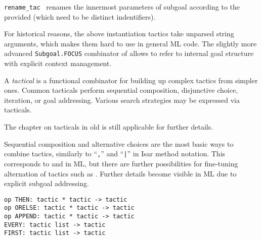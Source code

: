 \begin{isabellebody}
\begin{isamarkuptext}
\begin{description}
  \item \verb|rename_tac|~ renames the innermost
  parameters of subgoal  according to the provided  (which need to be distinct indentifiers).

  \end{description}

  For historical reasons, the above instantiation tactics take
  unparsed string arguments, which makes them hard to use in general
  ML code.  The slightly more advanced \verb|Subgoal.FOCUS| combinator
  of  allows to refer to internal goal
  structure with explicit context management.%
\end{isamarkuptext}%
\isamarkuptrue%
%
\endisatagmlref
{\isafoldmlref}%
%
\isadelimmlref
%
\endisadelimmlref
%
\isamarkuptrue%
%
\begin{isamarkuptext}%
A \emph{tactical} is a functional combinator for building up
  complex tactics from simpler ones.  Common tacticals perform
  sequential composition, disjunctive choice, iteration, or goal
  addressing.  Various search strategies may be expressed via
  tacticals.

  \medskip The chapter on tacticals in old \cite{isabelle-ref} is
  still applicable for further details.%
\end{isamarkuptext}%
\isamarkuptrue%
%
\isamarkuptrue%
%
\begin{isamarkuptext}%
Sequential composition and alternative choices are the most
  basic ways to combine tactics, similarly to ``\verb|,|'' and
  ``\verb||\verb,|,\verb||'' in Isar method notation.  This corresponds to
   and  in ML, but there are further
  possibilities for fine-tuning alternation of tactics such as .  Further details become visible in ML due to explicit
  subgoal addressing.%
\end{isamarkuptext}%
\isamarkuptrue%
%
\isadelimmlref
%
\endisadelimmlref
%
\isatagmlref
%
\begin{isamarkuptext}%
\begin{mldecls}
  \verb|op THEN: tactic * tactic -> tactic| \\
  \verb|op ORELSE: tactic * tactic -> tactic| \\
  \verb|op APPEND: tactic * tactic -> tactic| \\
  \verb|EVERY: tactic list -> tactic| \\
  \verb|FIRST: tactic list -> tactic| \\[0.5ex]


\end{mldecls}
\end{isamarkuptext}
\end{isabellebody}
